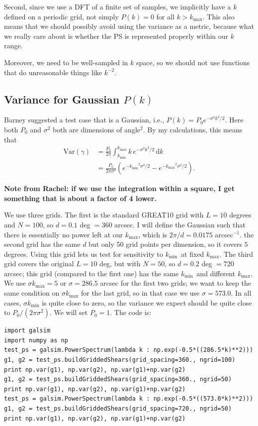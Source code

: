 \documentclass[preprint]{aastex}
\newcommand{\kmax}{\ensuremath{k_\mathrm{max}}}
\newcommand{\kmin}{\ensuremath{k_\mathrm{min}}}
\newcommand{\rmd}{\ensuremath{\mathrm{d}}}
\begin{document}
Second, since we use a DFT of a finite set of samples, we implicitly
have a $k$ defined on a periodic grid, not simply $P(k)=0$ for all
$k>\kmax$.  This also means that we should possibly avoid using the
variance as a metric, because what we really care about is whether the
PS is represented properly within our $k$ range.

Moreover, we need to be well-sampled in $k$ space, so we should not
use functions that do unreasonable things like $k^{-2}$.

\subsection{Variance for Gaussian $P(k)$}

Barney suggested a test case that is a Gaussian, i.e., $P(k) =
P_0 e^{-\sigma^2 k^2 / 2}$.  Here both $P_0$ and $\sigma^2$ both
are dimensions of angle$^2$.  By my calculations, this means that
\begin{align}
\mathrm{Var}(\gamma) &= \frac{P_0}{2\pi}\int_{\kmin}^{\kmax} k \,
e^{-\sigma^2 k^2/2} \,\rmd k \\
 &= \frac{P_0}{2\pi\sigma^2} (e^{-\kmin^2\sigma^2/2}-e^{-\kmax^2\sigma^2/2}).
\end{align}

\textbf{Note from Rachel: if we use the integration within a square, I
  get something that is about a factor of 4 lower.}

We use three grids. The first is the standard GREAT10 grid with $L=10$
degrees and $N=100$, so $d=0.1$ deg $=360$ arcsec.  I will define the
Gaussian such that there is essentially no power left at our \kmax,
which is $2\pi/d=0.0175$ arcsec$^{-1}$.  the second grid has the same
$d$ but only 50 grid points per dimension, so it covers $5$ degrees.
Using this grid lets us test for sensitivity to \kmin\ at fixed \kmax.
The third grid covers the original $L=10$ deg, but with $N=50$, so
$d=0.2$ deg $=720$ arcsec; this grid (compared to the first one) has the same \kmin\ and different \kmax. We use $\sigma \kmax=5$ or $\sigma=286.5$
arcsec for the first two grids; we want to keep the same condition on
$\sigma\kmax$ for the last grid, so in that case we use
$\sigma=573.0$.  In all cases, $\sigma\kmin$ is quite close to zero,
so the variance we expect should be quite close to
$P_0/(2\pi\sigma^2)$. We will set $P_0=1$. The code is:
\begin{verbatim}
import galsim
import numpy as np
test_ps = galsim.PowerSpectrum(lambda k : np.exp(-0.5*((286.5*k)**2)))
g1, g2 = test_ps.buildGriddedShears(grid_spacing=360., ngrid=100)
print np.var(g1), np.var(g2), np.var(g1)+np.var(g2)
g1, g2 = test_ps.buildGriddedShears(grid_spacing=360., ngrid=50)
print np.var(g1), np.var(g2), np.var(g1)+np.var(g2)
test_ps = galsim.PowerSpectrum(lambda k : np.exp(-0.5*((573.0*k)**2)))
g1, g2 = test_ps.buildGriddedShears(grid_spacing=720., ngrid=50)
print np.var(g1), np.var(g2), np.var(g1)+np.var(g2)
\end{verbatim}
\end{document}
